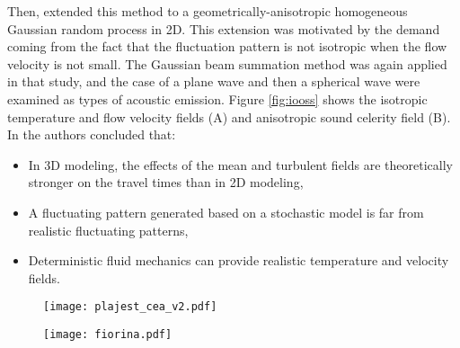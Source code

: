     Then, \textcite{Iooss2000Statisticalmomentsof} extended this method to a geometrically-anisotropic homogeneous Gaussian random process in 2D. This
extension was motivated by the demand coming from the fact that the fluctuation pattern is not isotropic when the flow velocity is not small. The Gaussian beam
summation method was again applied in that study, and the case of a plane wave and then a spherical wave were examined as types of acoustic emission.
Figure \ref{fig:iooss} shows the isotropic temperature and flow velocity fields (A) and anisotropic sound celerity field (B).
In \textcite{Iooss2002Numericalsimulationof} the authors concluded that:
    \begin{itemize}
        \item  In 3D modeling, the effects of the mean and turbulent fields are theoretically stronger on the travel times than in 2D modeling,
        \item  A fluctuating pattern generated based on a stochastic model is far from realistic fluctuating patterns,
        \item  Deterministic fluid mechanics can provide realistic temperature and velocity fields.
    \end{itemize}

    \begin{figure}[htbp]
        \centerline{\texttt{[image: plajest\_cea\_v2.pdf]}}
        \label{fig:plajest_cea}
    \end{figure}

    \begin{figure}[htbp]
        \centerline{\texttt{[image: fiorina.pdf]}}
        \label{fig:fiorina}
    \end{figure}


